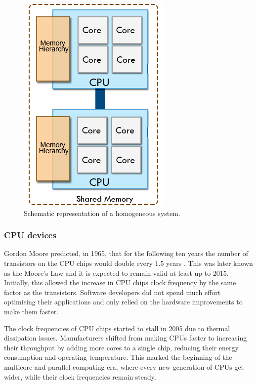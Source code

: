 \begin{figure}[!htp]
	\begin{center}
		\includegraphics[scale=0.45]{imgs/homoplats.png}
		\caption{Schematic representation of a homogeneous system.}
		\label{fig:homoplat}
	\end{center}
\end{figure}

\subsubsection*{CPU devices}
\label{cpu_devices}

Gordon Moore predicted, in 1965, that for the following ten years the number of transistors on the CPU chips would double every 1.5 years \cite{MooreLaw}. This was later known as the Moore’s Law and it is expected to remain valid at least up to 2015. Initially, this allowed the increase in CPU chips clock frequency by the same factor as the transistors. Software developers did not spend much effort optimising their applications and only relied on the hardware improvements to make them faster.

The clock frequencies of CPU chips started to stall in 2005 due to thermal dissipation issues. Manufacturers shifted from making CPUs faster to increasing their throughput by adding more cores to a single chip, reducing their energy consumption and operating temperature. This marked the beginning of the multicore and parallel computing era, where every new generation of CPUs get wider, while their clock frequencies remain steady.

